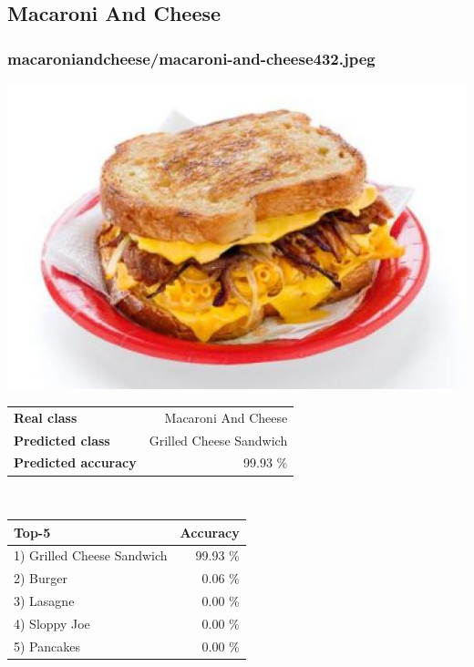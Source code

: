 \subsection{Macaroni And Cheese}
    
\subsubsection{macaroni\textunderscore and\textunderscore cheese/macaroni-and-cheese432.jpeg}

\begin{minipage}[t]{0.4\textwidth}
	\vspace{0pt}
	\includegraphics[width=\linewidth]{images/evaluation-images/macaroni_and_cheese/macaroni-and-cheese432.jpeg}
\end{minipage}
\hfill
\begin{minipage}[t]{0.5\textwidth}
	\vspace{0pt}\raggedright
	\begin{tabularx}{\textwidth}{X r}
		\small \textbf{Real class} & \small Macaroni And Cheese\\
		\small \textbf{Predicted class} & \small Grilled Cheese Sandwich\\
		\small \textbf{Predicted accuracy} & \small 99.93 \%
    \end{tabularx}\\
    
    \vspace{6pt}
	\begin{tabularx}{\textwidth}{X r}
        \small \textbf{Top-5} & \small \textbf{Accuracy} \\
        \hline
		\small 1) Grilled Cheese Sandwich & \small 99.93 \%\\\small 2) Burger & \small 0.06 \%\\\small 3) Lasagne & \small 0.00 \%\\\small 4) Sloppy Joe & \small 0.00 \%\\\small 5) Pancakes & \small 0.00 \%
    \end{tabularx}
\end{minipage}
    
